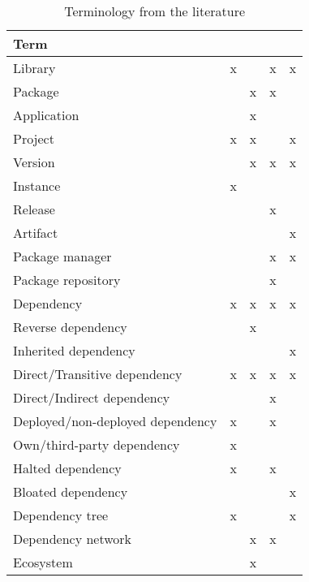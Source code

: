 \begin{table}[htb!]
    \begin{center}
    \begin{tabular}{|l|c|c|c|c|}
    \hline
    Term & \cite{pashchenko2018vulnerable} & \cite{kikas2017structure} & \cite{fasten2019survey} & \cite{soto2020comprehensive} \\
    \hline
    Library                           & x &   & x & x \\
    Package                           &   & x & x &   \\
    Application                       &   & x &   &   \\
    Project                           & x & x &   & x \\
    \hline
    Version                           &   & x & x & x \\
    Instance                          & x &   &   &   \\
    Release                           &   &   & x &   \\
    Artifact                          &   &   &   & x \\
    \hline
    Package manager                   &   &   & x & x \\
    Package repository                &   &   & x &   \\
    \hline
    Dependency                        & x & x & x & x \\
    Reverse dependency                &   & x &   &   \\
    Inherited dependency              &   &   &   & x \\
    Direct/Transitive dependency      & x & x & x & x \\
    Direct/Indirect dependency        &   &   & x &   \\
    Deployed/non-deployed dependency  & x &   & x &   \\
    Own/third-party dependency        & x &   &   &   \\
    Halted dependency                 & x &   & x &   \\
    Bloated dependency                &   &   &   & x \\
    \hline
    Dependency tree                   & x &   &   & x \\
    Dependency network                &   & x & x &   \\
    Ecosystem                         &   & x &   &   \\
    \hline
    \end{tabular}
    \end{center}
    \caption{Terminology from the literature}
    \label{table:terminology}
\end{table}

